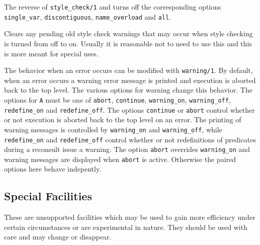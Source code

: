 \begin{description}
The reverse of {\tt style\_check/1} and turns off the corresponding options
{\tt single\_var}, {\tt discontiguous}, {\tt name\_overload} and {\tt all}.

Clears any pending old style check warnings that may occur when
style checking is turned from off to on. Usually it is reasonable
not to need to use this and this is more meant for special uses.

The behavior when an error occurs can be modified with
{\tt warning/1}. By default, when an error occurs a warning
error message is printed and execution is aborted back to the top level.
The various options for warning change this behavior.
The options for {\tt A} must be one of 
{\tt abort}, {\tt continue},
{\tt warning\_on}, {\tt warning\_off}, {\tt redefine\_on}
and {\tt redefine\_off}.
The options {\tt continue} or {\tt abort} control whether or not
execution is aborted back to the top level on an error.
The printing of warning messages is controlled by 
{\tt warning\_on} and {\tt warning\_off},
while {\tt redefine\_on} and {\tt redefine\_off} control whether or not
redefinitions of predicates during a reconsult issue a warning.
The option {\tt abort} overrides {\tt warning\_on} and warning messages
are displayed when {\tt abort} is active.
Otherwise the paired options here behave indepently.
\chgbarend
\end{description}

\subsection{Special Facilities}
\label{special-section}
These are unsupported 
facilities which may be used to gain more efficiency
under certain circumstances or are experimental in nature.
They should be used with care and may change or disappear.

